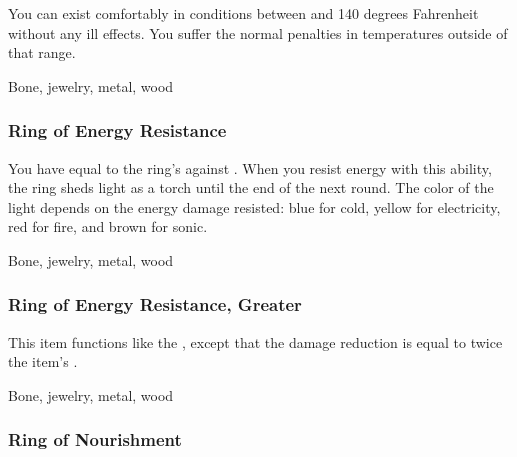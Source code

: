 You can exist comfortably in conditions between  and 140 degrees Fahrenheit without any ill effects.
You suffer the normal penalties in temperatures outside of that range.



 


 Bone, jewelry, metal, wood


\lowercase{\hypertarget{item:Ring of Energy Resistance}{}}\label{item:Ring of Energy Resistance}
\hypertarget{item:Ring of Energy Resistance}{\subsubsection{Ring of Energy Resistance\hfill{}}}

You have  equal to the ring's  against .
When you resist energy with this ability, the ring sheds light as a torch until the end of the next round.
The color of the light depends on the energy damage resisted: blue for cold, yellow for electricity, red for fire, and brown for sonic.



 


 Bone, jewelry, metal, wood


\lowercase{\hypertarget{item:Ring of Energy Resistance, Greater}{}}\label{item:Ring of Energy Resistance, Greater}
\hypertarget{item:Ring of Energy Resistance, Greater}{\subsubsection{Ring of Energy Resistance, Greater\hfill{}}}

This item functions like the , except that the damage reduction is equal to twice the item's .



 


 Bone, jewelry, metal, wood


\lowercase{\hypertarget{item:Ring of Nourishment}{}}\label{item:Ring of Nourishment}
\hypertarget{item:Ring of Nourishment}{\subsubsection{Ring of Nourishment\hfill{}}}

